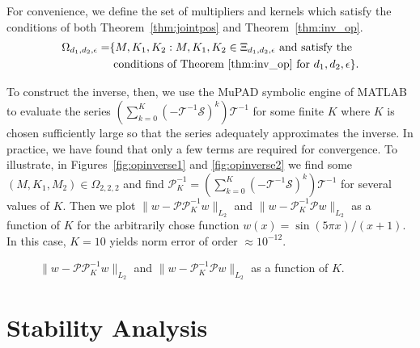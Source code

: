 \documentclass[9pt,journal,twocolumn]{IEEEtran}
\begin{document}
For convenience, we define the set of multipliers and kernels which satisfy the conditions of both Theorem~\ref{thm:jointpos} and Theorem~\ref{thm:inv_op}.
\begin{align*}
\Omega_{d_1,d_2,\epsilon}=&\{M,K_1,K_2:M,K_1,K_2 \in \Xi_{d_1,d_2,\epsilon} \text{ and satisfy the} \\
& \text{ conditions of Theorem~\ref{thm:inv_op} for }d_1,d_2,\epsilon \}.
\end{align*}

To construct the inverse, then, we use the MuPAD symbolic engine of MATLAB to evaluate the series $\left(\sum^K_{k=0}\left(-\mathcal{T}^{-1}\mathcal{S}\right)^k\right)\mathcal{T}^{-1}$ for some finite $K$ where $K$ is chosen sufficiently large so that the series adequately approximates the inverse. In practice, we have found that only a few terms are required for convergence. To illustrate, in Figures~\ref{fig:opinverse1} and \ref{fig:opinverse2} we find some $(M,K_1,M_2) \in \Omega_{2,2,2}$ and find $\mathcal{P}_K^{-1}=\left(\sum^K_{k=0}\left(-\mathcal{T}^{-1}\mathcal{S}\right)^k\right)\mathcal{T}^{-1}$
for several values of $K$. Then we plot $\|w-\mathcal{P}\mathcal{P}_K^{-1}w\|_{L_2}$ and $\|w-\mathcal{P}_K^{-1}\mathcal{P}w\|_{L_2}$ as a function of $K$ for the arbitrarily chose function $w(x)=\sin(5 \pi x)/(x+1)$. In this case, $K=10$ yields norm error of order $\approx 10^{-12}$.

\begin{figure}[ht]
\centering
{}
\quad
{}
\caption{$\|w-\mathcal{P}\mathcal{P}_K^{-1}w\|_{L_2}$ and $\|w-\mathcal{P}_K^{-1}\mathcal{P}w\|_{L_2}$  as a function of $K$.}
\end{figure}

\section{Stability Analysis}\label{sec:stability}
\end{document}
